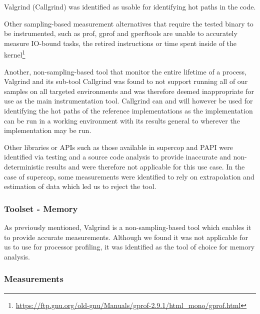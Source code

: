 Valgrind (Callgrind) was identified as usable for identifying hot paths in the code.

\noindent
{}
Other sampling-based measurement alternatives that require the tested binary to be instrumented, such as prof, gprof and gperftools are unable to accurately measure IO-bound tasks, the retired instructions or time spent inside of the kernel\footnote{\href{https://ftp.gnu.org/old-gnu/Manuals/gprof-2.9.1/html\_mono/gprof.html}{https://ftp.gnu.org/old-gnu/Manuals/gprof-2.9.1/html\_mono/gprof.html}}

Another, non-sampling-based tool that monitor the entire lifetime of a process, Valgrind and its sub-tool Callgrind was found to not support running all of our samples on all targeted environments and was therefore deemed inappropriate for use as the main instrumentation tool. Callgrind can and will however be used for identifying the hot paths of the reference implementations as the implementation can be run in a working environment with its results general to wherever the implementation may be run.

Other libraries or APIs such as those available in \gls{supercop} and PAPI were identified via testing and a source code analysis to provide inaccurate and non-deterministic results and were therefore not applicable for this use case. In the case of \gls{supercop}, some measurements were identified to rely on extrapolation and estimation of data which led us to reject the tool.

\subsubsection{Toolset - Memory}
As previously mentioned, Valgrind is a non-sampling-based tool which enables it to provide accurate measurements. Although we found it was not applicable for us to use for processor profiling, it was identified as the tool of choice for memory analysis.

\noindent
{}

\subsubsection{Measurements}

